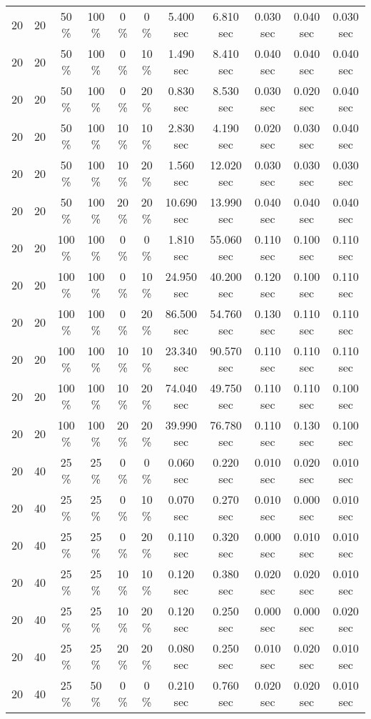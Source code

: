 \documentclass{article}
\begin{document}
\begin{longtable}[]{@{}ccccccccccc@{}}
20 & 20 & 50 \% & 100 \% & 0 \% & 0 \% & 5.400 sec & 6.810 sec & 0.030 sec & 0.040 sec & 0.030 sec \\
20 & 20 & 50 \% & 100 \% & 0 \% & 10 \% & 1.490 sec & 8.410 sec & 0.040 sec & 0.040 sec & 0.040 sec \\
20 & 20 & 50 \% & 100 \% & 0 \% & 20 \% & 0.830 sec & 8.530 sec & 0.030 sec & 0.020 sec & 0.040 sec \\
20 & 20 & 50 \% & 100 \% & 10 \% & 10 \% & 2.830 sec & 4.190 sec & 0.020 sec & 0.030 sec & 0.040 sec \\
20 & 20 & 50 \% & 100 \% & 10 \% & 20 \% & 1.560 sec & 12.020 sec & 0.030 sec & 0.030 sec & 0.030 sec \\
20 & 20 & 50 \% & 100 \% & 20 \% & 20 \% & 10.690 sec & 13.990 sec & 0.040 sec & 0.040 sec & 0.040 sec \\
20 & 20 & 100 \% & 100 \% & 0 \% & 0 \% & 1.810 sec & 55.060 sec & 0.110 sec & 0.100 sec & 0.110 sec \\
20 & 20 & 100 \% & 100 \% & 0 \% & 10 \% & 24.950 sec & 40.200 sec & 0.120 sec & 0.100 sec & 0.110 sec \\
20 & 20 & 100 \% & 100 \% & 0 \% & 20 \% & 86.500 sec & 54.760 sec & 0.130 sec & 0.110 sec & 0.110 sec \\
20 & 20 & 100 \% & 100 \% & 10 \% & 10 \% & 23.340 sec & 90.570 sec & 0.110 sec & 0.110 sec & 0.110 sec \\
20 & 20 & 100 \% & 100 \% & 10 \% & 20 \% & 74.040 sec & 49.750 sec & 0.110 sec & 0.110 sec & 0.100 sec \\
20 & 20 & 100 \% & 100 \% & 20 \% & 20 \% & 39.990 sec & 76.780 sec & 0.110 sec & 0.130 sec & 0.100 sec \\
20 & 40 & 25 \% & 25 \% & 0 \% & 0 \% & 0.060 sec & 0.220 sec & 0.010 sec & 0.020 sec & 0.010 sec \\
20 & 40 & 25 \% & 25 \% & 0 \% & 10 \% & 0.070 sec & 0.270 sec & 0.010 sec & 0.000 sec & 0.010 sec \\
20 & 40 & 25 \% & 25 \% & 0 \% & 20 \% & 0.110 sec & 0.320 sec & 0.000 sec & 0.010 sec & 0.010 sec \\
20 & 40 & 25 \% & 25 \% & 10 \% & 10 \% & 0.120 sec & 0.380 sec & 0.020 sec & 0.020 sec & 0.010 sec \\
20 & 40 & 25 \% & 25 \% & 10 \% & 20 \% & 0.120 sec & 0.250 sec & 0.000 sec & 0.000 sec & 0.020 sec \\
20 & 40 & 25 \% & 25 \% & 20 \% & 20 \% & 0.080 sec & 0.250 sec & 0.010 sec & 0.020 sec & 0.010 sec \\
20 & 40 & 25 \% & 50 \% & 0 \% & 0 \% & 0.210 sec & 0.760 sec & 0.020 sec & 0.020 sec & 0.010 sec \\

\end{longtable}
\end{document}
